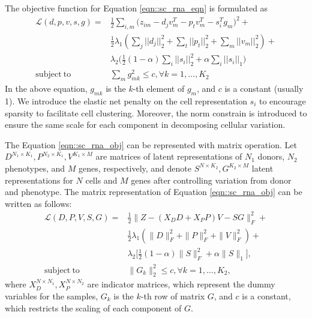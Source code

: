 \documentclass[12pt]{article}
\begin{document}
    The objective function for Equation \ref{eqn::sc_rna_eqn} is formulated as
    \begin{equation}
      \label{eqn::sc_rna_obj}
      \begin{split}
        \mathcal{L}(d, p, v, s, g) = & \frac{1}{2} \sum_{i,m}  \big( z_{im} - d_j v_m^T - p_t v_m^T - s_i^T g_m \big)^2 + \\ 
        & \frac{1}{2} \lambda_1 (\sum_j ||d_j||_2^2 + \sum_t ||p_t||_2^2 + \sum_m ||v_m||_2^2 ) + \\ 
        & \lambda_2 \big( \frac{1}{2} (1 - \alpha) \sum_i ||s_i||_2^2 + \alpha \sum_i ||s_i||_1 \big) \\
        \mathrm{subject\ to} \qquad & \sum_m g_{mk}^2 \leq c, \forall k = 1, \dots, K_2
      \end{split}
    \end{equation}
    In the above equation, $g_{mk}$ is the $k$-th element of $g_m$, and $c$ is a constant (usually 1). We introduce the elastic net penalty on the cell representation $s_i$ to encourage sparsity to facilitate cell clustering. Moreover, the norm constrain is introduced to ensure the same scale for each component in decomposing cellular variation.
    
    The Equation \ref{eqn::sc_rna_obj} can be represented with matrix operation. Let $D^{N_1 \times K_1}, P^{N_2 \times K_1}, V^{K_1 \times M}$ are matrices of latent representations of $N_1$ donors, $N_2$ phenotypes, and $M$ genes, respectively, and denote $S^{N \times K_2}, G^{K_2 \times M}$ latent representations for $N$ cells and $M$ genes after controlling  variation from donor and phenotype. The matrix representation of Equation \ref{eqn::sc_rna_obj} can be written as follows:
    \begin{equation}
      \label{eqn::sc_rna_obj_mat}
      \begin{split}
        \mathcal{L} (D, P, V, S, G) = & \frac{1}{2} \big \| Z -  (X_D D + X_P P) V -  S G \big \|_F^2 + \\
        & \frac{1}{2} \lambda_1 (\|D\|_F^2 + \|P\|_F^2 + \|V\|_F^2) + \\
        & \lambda_2 \big[ \frac{1}{2} (1 - \alpha) \|S\|_F^2 + \alpha \|S\|_1 \big], \\
        \mathrm{subject\ to} \qquad & \|G_k\|_2^2 \leq c, \forall k = 1, \dots, K_2,
      \end{split}
    \end{equation}
    where $X_D^{N \times N_1}, X_P^{N \times N_2}$ are indicator matrices, which represent the dummy variables for the samples, $G_k$ is the $k$-th row of matrix $G$, and $c$ is a constant, which restricts the scaling of each component of $G$.
  
\end{document}
